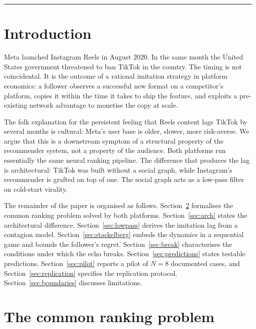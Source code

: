 \documentclass[12pt,a4paper]{article}
\begin{document}
\noindent\rule{\textwidth}{0.4pt}

\vspace{0.5cm}

\section{Introduction}
\label{sec:intro}

Meta launched Instagram Reels in August 2020. In the same month the United States government threatened to ban TikTok in the country. The timing is not coincidental. It is the outcome of a rational imitation strategy in platform economics: a follower observes a successful new format on a competitor's platform, copies it within the time it takes to ship the feature, and exploits a pre-existing network advantage to monetise the copy at scale.

The folk explanation for the persistent feeling that Reels content lags TikTok by several months is cultural: Meta's user base is older, slower, more risk-averse. We argue that this is a downstream symptom of a structural property of the recommender system, not a property of the audience. Both platforms run essentially the same neural ranking pipeline. The difference that produces the lag is architectural: TikTok was built without a social graph, while Instagram's recommender is grafted on top of one. The social graph acts as a low-pass filter on cold-start virality.

The remainder of the paper is organised as follows. Section~\ref{sec:ranking} formalises the common ranking problem solved by both platforms. Section~\ref{sec:arch} states the architectural difference. Section~\ref{sec:lowpass} derives the imitation lag from a contagion model. Section~\ref{sec:stackelberg} embeds the dynamics in a sequential game and bounds the follower's regret. Section~\ref{sec:break} characterises the conditions under which the echo breaks. Section~\ref{sec:predictions} states testable predictions. Section~\ref{sec:pilot} reports a pilot of $N = 8$ documented cases, and Section~\ref{sec:replication} specifies the replication protocol. Section~\ref{sec:boundaries} discusses limitations.

\section{The common ranking problem}
\label{sec:ranking}
\end{document}
